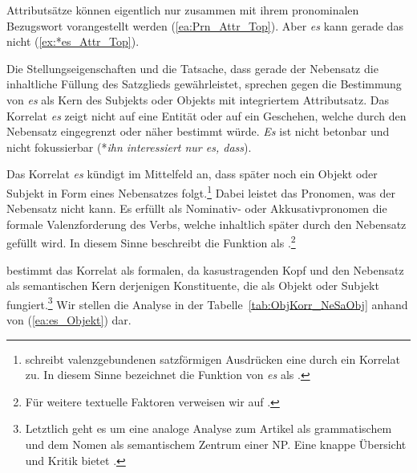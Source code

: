 Attributsätze können eigentlich nur zusammen mit ihrem pronominalen Bezugswort vorangestellt werden (\ref{ea:Prn_Attr_Top}). Aber \textit{es} kann gerade das nicht (\ref{ex:*es_Attr_Top}).

\ea \label{ea:NeSa_Kor_Top}
\label{ea:Prn_Attr_Top}
\label{ex:*es_Attr_Top}
\z 
\z 


Die Stellungseigenschaften und die Tatsache, dass gerade der Nebensatz die inhaltliche Füllung des Satzglieds gewährleistet, sprechen gegen die Bestimmung von \textit{es} als Kern des Subjekts oder Objekts mit integriertem Attributsatz. Das Korrelat \textit{es} zeigt nicht auf eine Entität oder auf ein Geschehen, welche durch den Nebensatz eingegrenzt oder näher bestimmt würde. \textit{Es} ist nicht betonbar und nicht fokussierbar (*\textit{ihn interessiert nur es, dass}). 

Das Korrelat \textit{es} kündigt im Mittelfeld an, dass später noch ein Objekt oder Subjekt in Form eines Nebensatzes folgt.\footnote{\citet[907]{Oppenrieder2006} schreibt valenzgebundenen satzförmigen Ausdrücken eine  durch ein Korrelat zu. In diesem Sinne bezeichnet \citet[589]{Agel2017} die Funktion von \textit{es} als .} Dabei leistet das Pronomen, was der Nebensatz nicht kann. Es erfüllt als Nominativ- oder Akkusativpronomen die formale Valenzforderung des Verbs, welche inhaltlich später durch den Nebensatz gefüllt wird. In diesem Sinne beschreibt \citet[167]{Breindl1989} die Funktion als .\footnote{Für weitere textuelle Faktoren verweisen wir auf \citet[453--454]{Pittner2013}.} 

\citet[353]{Eisenberg2020_Satz} bestimmt das Korrelat als formalen, da kasustragenden Kopf und den Nebensatz als semantischen Kern derjenigen Konstituente, die als Objekt oder Subjekt fungiert.\footnote{Letztlich geht es um eine analoge Analyse zum Artikel als grammatischem und dem Nomen als semantischem Zentrum einer NP. Eine knappe Übersicht und Kritik bietet \citet[451]{Pittner2013}.} Wir stellen die Analyse in der Tabelle~\ref{tab:ObjKorr_NeSaObj} anhand von (\ref{ea:es_Objekt}) dar. 

